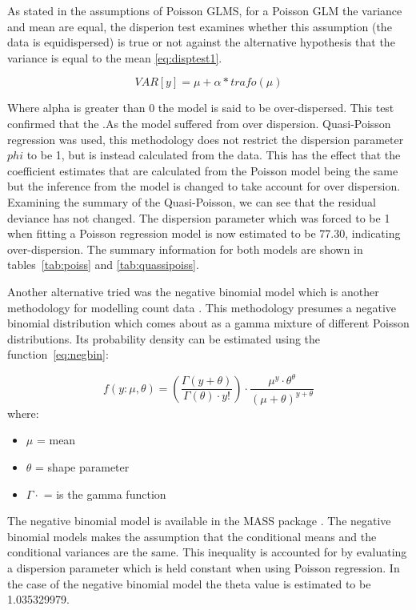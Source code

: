 As stated in the assumptions of Poisson GLMS, for a Poisson GLM the variance and mean are equal, the disperion test \citep{AerRPack} examines whether this assumption (the data is equidispersed) is true or not against the alternative hypothesis  that the variance is equal to the mean \ref{eq:disptest1}.

\begin{equation} VAR[y] = \mu + \alpha * trafo(\mu)   \label{eq:disptest1}  \end{equation}

Where alpha is greater than 0 the model is said to be over-dispersed. This test confirmed that the .As the  model suffered from over dispersion.  Quasi-Poisson regression was used, this methodology does not restrict the dispersion parameter $phi$ to be 1, but is instead  calculated from the data. This has the effect that the coefficient estimates that are calculated from the Poisson model being the same  but the inference from the model is  changed to take account for over dispersion. Examining the summary of the Quasi-Poisson, we can see that the residual deviance has not changed. The dispersion parameter which was forced to be 1 when fitting a Poisson regression model is now estimated to be 77.30, indicating over-dispersion. The summary information for both models are shown in tables~\ref{tab:poiss} and \ref{tab:quassipoiss}. 

Another alternative tried was the negative binomial model which is another methodology for modelling count data \citep{ver2007quasi}. This methodology presumes a negative binomial distribution which comes about as a gamma mixture of different Poisson distributions. Its probability density can be estimated using the function~\ref{eq:negbin}:

\begin{equation}  f(y:\mu,\theta)=  (\frac{\Gamma(y+\theta)}{\Gamma(\theta)\cdot y!})\cdot \frac{\mu^y\cdot \theta^\theta}{(\mu+\theta)^{y+\theta}}  \label{eq:negbin}  \end{equation}
where:
\begin{itemize}
\item[] $\mu$ =  mean
\item[] $\theta$ = shape parameter
\item[] $\Gamma\cdot$ = is the gamma function
\end{itemize}

The negative binomial model is available in the MASS package \citep{venables2002random}. The negative binomial models makes the assumption that the conditional means and the conditional variances are the same. This inequality is accounted for by evaluating a dispersion parameter which is held constant when using Poisson regression. In the case of the negative binomial model the theta value is estimated to be 1.035329979.


